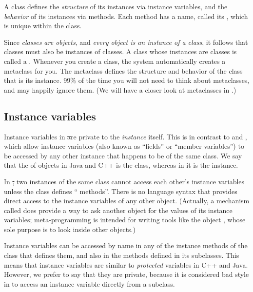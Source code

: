 \documentclass[a4paper,10pt,twoside]{book}
\begin{document}
A class defines the \emph{structure} of its instances via instance variables,
and the \emph{behavior} of its instances via methods.
Each method has a name, called its , which is unique within the class.

Since \emph{classes are objects}, and \emph{every object is an instance of a class}, it follows that classes must also be instances of classes.
A class whose instances are classes is called a .
Whenever you create a class, the system automatically creates a metaclass for you.
The metaclass defines the structure and behavior of the class that is its instance.
99\%  of the time you will not need to think about metaclasses, and may happily ignore them.
(We will have a closer look at metaclasses in .)

\subsection{Instance variables}

Instance variables in \st are private to the \emph{instance} itself.
This is in contrast to  and , which allow instance variables (also known as ``fields'' or ``member variables'') to be accessed by any other instance that happens to be of the same class.
We say that the  of objects in Java and C++ is the class, whereas in \st it is the instance.

In \st, two instances of the same class cannot access each other's instance variables unless the class defines `` methods''.
There is no language syntax that provides direct access to the instance variables of any other object.
(Actually, a mechanism called 
does provide a way to ask another object for the values of its instance variables; meta-programming is intended for writing tools like the object , whose sole purpose is to look inside other objects.)

Instance variables can be accessed by name in any of the instance methods of the class that defines them, and also in the methods defined in its subclasses. This means that \st instance variables are similar to \emph{protected} variables in C++ and Java. However, we prefer to say that they are private, because it is considered bad style in \st to access an instance variable directly from a subclass. 
\end{document}
